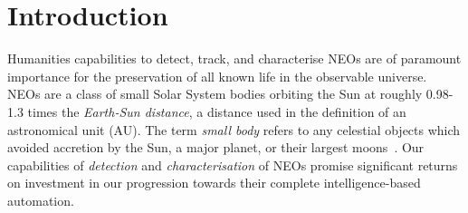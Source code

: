 \chapter{Introduction}

Humanities capabilities to detect, track, and characterise \glspl{NEO} are of 
paramount importance for the preservation of all known life in the observable universe. \glspl{NEO} are a class of small Solar System bodies orbiting the Sun at roughly 0.98-1.3 times the \textit{Earth-Sun distance}, a distance used in the definition of an astronomical unit (AU). The term \textit{small body} refers to any celestial objects which avoided accretion by the Sun, a major planet, or their largest moons~\cite{Davidsson2021}. Our capabilities of \textit{detection} and \textit{characterisation} of \glspl{NEO} promise significant returns on investment in our progression towards their complete intelligence-based automation. %

